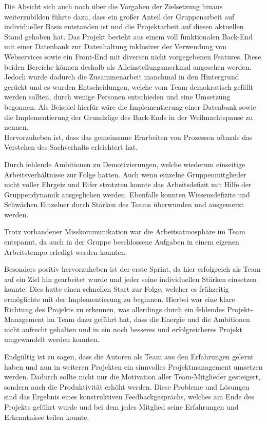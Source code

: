 Die Absicht sich auch noch über die Vorgaben der Zielsetzung hinaus weiterzubilden führte dazu, dass ein großer Anteil der Gruppenarbeit auf individueller Basis entstanden ist und die Projektarbeit auf diesen aktuellen Stand gehoben hat.
Das Projekt besteht aus einem voll funktionalen Back-End mit einer Datenbank zur Datenhaltung inklusiver der Verwendung von Webservices sowie ein Front-End mit diversen nicht vorgegebenen Features.
Diese beiden Bereiche können deshalb als Alleinstellungsmerkmal angesehen werden.\\
Jedoch wurde dadurch die Zusammenarbeit manchmal in den Hintergrund gerückt und es wurden Entscheidungen, welche vom Team demokratisch gefällt werden sollten, durch wenige Personen entschieden und eine Umsetzung begonnen.
Als Beispiel hierfür wäre die Implementierung einer Datenbank sowie die Implementierung der Grundzüge des Back-Ends in der Weihnachtspause zu nennen.\\
Hervorzuheben ist, dass das gemeinsame Erarbeiten von Prozessen oftmals das Verstehen des Sachverhalts erleichtert hat.

Durch fehlende Ambitionen zu Demotivierungen, welche wiederum einseitige Arbeitsverhältnisse zur Folge hatten.
Auch wenn einzelne Gruppenmitglieder nicht voller Ehrgeiz und Eifer strotzten konnte das Arbeitsdefizit mit Hilfe der Gruppendynamik ausgeglichen werden.
Ebenfalls konnten Wissensdefizite und Schwächen Einzelner durch Stärken des Teams überwunden und ausgemerzt werden.

Trotz vorhandener Misskommunikation war die Arbeitsatmosphäre im Team entspannt, da auch in der Gruppe beschlossene Aufgaben in einem eigenen Arbeitstempo erledigt werden konnten.

Besonders positiv hervorzuheben ist der erste Sprint, da hier erfolgreich als Team auf ein Ziel hin gearbeitet wurde und jeder seine individuellen Stärken einsetzen konnte.
Dies hatte einen schnellen Start zur Folge, welcher es frühzeitig ermöglichte mit der Implementierung zu beginnen.
Hierbei war eine klare Richtung des Projekts zu erkennen, was allerdings durch ein fehlendes Projekt-Management im Team dazu geführt hat, dass die Energie und die Ambitionen nicht aufrecht gehalten und in ein noch besseres und erfolgreicheres Projekt umgewandelt werden konnten.

Endgültig ist zu sagen, dass die Autoren als Team aus den Erfahrungen gelernt haben und nun in weiteren Projekten ein sinnvolles Projektmanagement umsetzen werden.
Dadurch sollte nicht nur die Motivation aller Team-Mitglieder gesteigert, sondern auch die Produktivität erhöht werden.
Diese Probleme und Lösungen sind das Ergebnis eines konstruktiven Feedbackgesprächs, welches am Ende des Projekts geführt wurde und bei dem jedes Mitglied seine Erfahrungen und Erkenntnisse teilen konnte.
